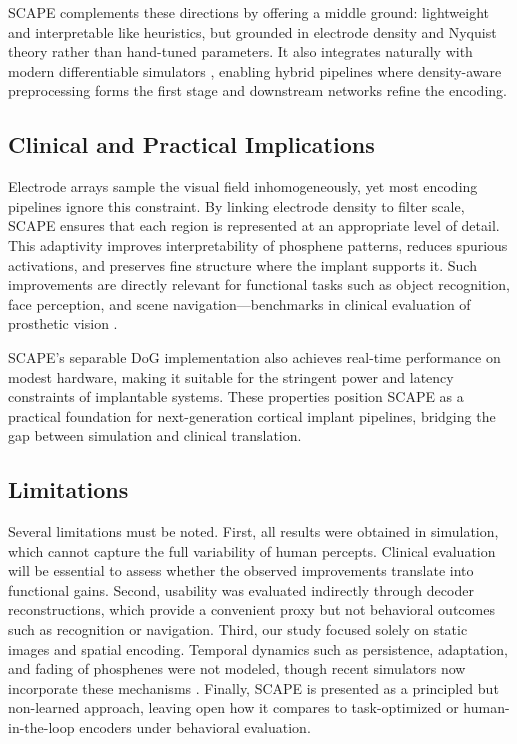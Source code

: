 SCAPE complements these directions by offering a middle ground: lightweight and interpretable like heuristics, but grounded in electrode density and Nyquist theory rather than hand-tuned parameters. It also integrates naturally with modern differentiable simulators \cite{vanderGrinten2024}, enabling hybrid pipelines where density-aware preprocessing forms the first stage and downstream networks refine the encoding.

\subsection{Clinical and Practical Implications}
Electrode arrays sample the visual field inhomogeneously, yet most encoding pipelines ignore this constraint. By linking electrode density to filter scale, SCAPE ensures that each region is represented at an appropriate level of detail. This adaptivity improves interpretability of phosphene patterns, reduces spurious activations, and preserves fine structure where the implant supports it. Such improvements are directly relevant for functional tasks such as object recognition, face perception, and scene navigation—benchmarks in clinical evaluation of prosthetic vision \cite{Stingl2015,Fernandez2021}. 

SCAPE’s separable DoG implementation also achieves real-time performance on modest hardware, making it suitable for the stringent power and latency constraints of implantable systems. These properties position SCAPE as a practical foundation for next-generation cortical implant pipelines, bridging the gap between simulation and clinical translation.

\subsection{Limitations}
Several limitations must be noted. First, all results were obtained in simulation, which cannot capture the full variability of human percepts. Clinical evaluation will be essential to assess whether the observed improvements translate into functional gains. Second, usability was evaluated indirectly through decoder reconstructions, which provide a convenient proxy but not behavioral outcomes such as recognition or navigation. Third, our study focused solely on static images and spatial encoding. Temporal dynamics such as persistence, adaptation, and fading of phosphenes \cite{Schmidt1996,Bak1990,Dobelle1974,Barlett2008,Fernandez2021,Beauchamp2020} were not modeled, though recent simulators now incorporate these mechanisms \cite{vanderGrinten2024}. Finally, SCAPE is presented as a principled but non-learned approach, leaving open how it compares to task-optimized or human-in-the-loop encoders under behavioral evaluation.

